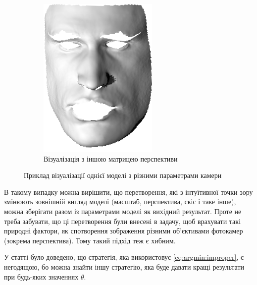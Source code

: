 \begin{figure}[h]
\begin{subfigure}[b]{0.4\textwidth}
    \includegraphics[width=\textwidth]{images/statue-perspective}
    \caption{Візуалізація з іншою матрицею перспективи}
    \label{fig:argmin:statue-distorted}
  \end{subfigure}
  \caption{Приклад візуалізації однієї моделі з різними параметрами камери}
\end{figure}

В такому випадку можна вирішити,
що перетворення, які з інтуїтивної точки зору змінюють зовнішній вигляд моделі
(масштаб, перспектива, скіс і таке інше),
можна зберігати разом із параметрами моделі як вихідний результат.
Проте не треба забувати, що ці перетворення були внесені в задачу,
щоб врахувати такі природні фактори,
як спотворення зображення різними об'єктивами фотокамер (зокрема перспектива).
Тому такий підхід теж є хибним.

У статті \cite{schlezinger:2013} було доведено,
що стратегія, яка використовує \eqref{eq:argmin:improper}, є негодящою,
бо можна знайти іншу стратегію,
яка буде давати кращі результати при будь-яких значеннях $\theta$.
